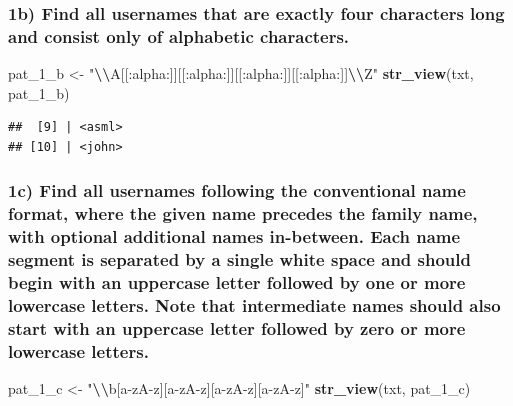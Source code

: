 \documentclass[
]{article}
\newenvironment{Shaded}{\begin{snugshade}}{\end{snugshade}}
\newcommand{\FunctionTok}[1]{\textcolor[rgb]{0.13,0.29,0.53}{\textbf{#1}}}
\newcommand{\NormalTok}[1]{#1}
\newcommand{\OtherTok}[1]{\textcolor[rgb]{0.56,0.35,0.01}{#1}}
\newcommand{\SpecialCharTok}[1]{\textcolor[rgb]{0.81,0.36,0.00}{\textbf{#1}}}
\newcommand{\StringTok}[1]{\textcolor[rgb]{0.31,0.60,0.02}{#1}}
\begin{document}
\subsubsection{1b) Find all usernames that are exactly four characters
long and consist only of alphabetic
characters.}\label{b-find-all-usernames-that-are-exactly-four-characters-long-and-consist-only-of-alphabetic-characters.}

\begin{Shaded}
\begin{Highlighting}[]
\NormalTok{pat\_1\_b }\OtherTok{\textless{}{-}} \StringTok{"}\SpecialCharTok{\textbackslash{}\textbackslash{}}\StringTok{A[[:alpha:]][[:alpha:]][[:alpha:]][[:alpha:]]}\SpecialCharTok{\textbackslash{}\textbackslash{}}\StringTok{Z"}
\FunctionTok{str\_view}\NormalTok{(txt, pat\_1\_b)}
\end{Highlighting}
\end{Shaded}

\begin{verbatim}
##  [9] | <asml>
## [10] | <john>
\end{verbatim}

\subsubsection{1c) Find all usernames following the conventional name
format, where the given name precedes the family name, with optional
additional names in-between. Each name segment is separated by a single
white space and should begin with an uppercase letter followed by one or
more lowercase letters. Note that intermediate names should also start
with an uppercase letter followed by zero or more lowercase
letters.}\label{c-find-all-usernames-following-the-conventional-name-format-where-the-given-name-precedes-the-family-name-with-optional-additional-names-in-between.-each-name-segment-is-separated-by-a-single-white-space-and-should-begin-with-an-uppercase-letter-followed-by-one-or-more-lowercase-letters.-note-that-intermediate-names-should-also-start-with-an-uppercase-letter-followed-by-zero-or-more-lowercase-letters.}

\begin{Shaded}
\begin{Highlighting}[]
\NormalTok{pat\_1\_c }\OtherTok{\textless{}{-}} \StringTok{"}\SpecialCharTok{\textbackslash{}\textbackslash{}}\StringTok{b[a{-}zA{-}z][a{-}zA{-}z][a{-}zA{-}z][a{-}zA{-}z]"}
\FunctionTok{str\_view}\NormalTok{(txt, pat\_1\_c)}
\end{Highlighting}
\end{Shaded}
\end{document}
